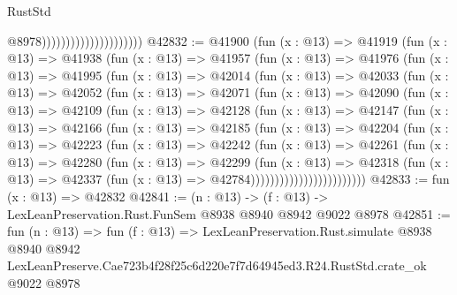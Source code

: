 \begin{lexlean}{RustStd}
\begin{coremodule}
                                              @8978)))))))))))))))))))))
@42832 := @41900
    (fun (x : @13) =>
    @41919
      (fun (x : @13) =>
      @41938
        (fun (x : @13) =>
        @41957
          (fun (x : @13) =>
          @41976
            (fun (x : @13) =>
            @41995
              (fun (x : @13) =>
              @42014
                (fun (x : @13) =>
                @42033
                  (fun (x : @13) =>
                  @42052
                    (fun (x : @13) =>
                    @42071
                      (fun (x : @13) =>
                      @42090
                        (fun (x : @13) =>
                        @42109
                          (fun (x : @13) =>
                          @42128
                            (fun (x : @13) =>
                            @42147
                              (fun (x : @13) =>
                              @42166
                                (fun (x : @13) =>
                                @42185
                                  (fun (x : @13) =>
                                  @42204
                                    (fun (x : @13) =>
                                    @42223
                                      (fun (x : @13) =>
                                      @42242
                                        (fun (x : @13) =>
                                        @42261
                                          (fun (x : @13) =>
                                          @42280
                                            (fun (x : @13) =>
                                            @42299
                                              (fun (x : @13) =>
                                              @42318
                                                (fun (x : @13) =>
                                                @42337
                                                  (fun (x : @13) => @42784))))))))))))))))))))))))
@42833 := fun (x : @13) => @42832
@42841 := (n : @13) -> (f : @13) -> LexLeanPreservation.Rust.FunSem @8938 @8940 @8942 @9022 @8978
@42851 := fun (n : @13) =>
  fun (f : @13) =>
  LexLeanPreservation.Rust.simulate
    @8938
    @8940
    @8942
    LexLeanPreserve.Cae723b4f28f25c6d220e7f7d64945ed3.R24.RustStd.crate_ok
    @9022
    @8978
\end{coremodule}
\end{lexlean}
